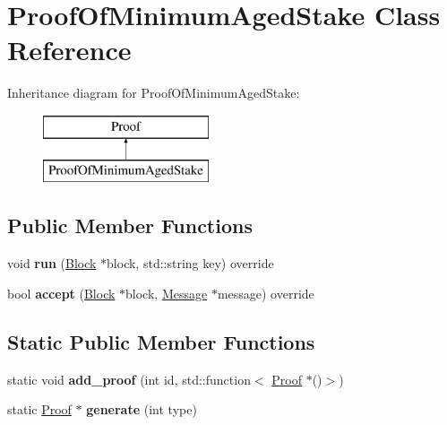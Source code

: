 \hypertarget{classProofOfMinimumAgedStake}{}\section{Proof\+Of\+Minimum\+Aged\+Stake Class Reference}
\label{classProofOfMinimumAgedStake}
Inheritance diagram for Proof\+Of\+Minimum\+Aged\+Stake\+:\begin{figure}[H]
\begin{center}
\leavevmode
\includegraphics[height=2.000000cm]{classProofOfMinimumAgedStake}
\end{center}
\end{figure}
\subsection*{Public Member Functions}
\begin{DoxyCompactItemize}
\item 
\mbox{\label{classProofOfMinimumAgedStake_aa850369d6f8ebf7fa833821a43049147}} 
void {\bfseries run} (\mbox{\hyperlink{classBlock}{Block}} $\ast$block, std\+::string key) override
\item 
\mbox{\label{classProofOfMinimumAgedStake_add68213606b37c50390cf1a0dd16c17b}} 
bool {\bfseries accept} (\mbox{\hyperlink{classBlock}{Block}} $\ast$block, \mbox{\hyperlink{classMessage}{Message}} $\ast$message) override
\end{DoxyCompactItemize}
\subsection*{Static Public Member Functions}
\begin{DoxyCompactItemize}
\item 
\mbox{\label{classProof_a93208e5161d25f8533849ac2dac8d6b8}} 
static void {\bfseries add\+\_\+proof} (int id, std\+::function$<$ \mbox{\hyperlink{classProof}{Proof}} $\ast$()$>$)
\item 
\mbox{\label{classProof_a267f0f4587babb59884b5f280e2d54c8}} 
static \mbox{\hyperlink{classProof}{Proof}} $\ast$ {\bfseries generate} (int type)
\end{DoxyCompactItemize}
